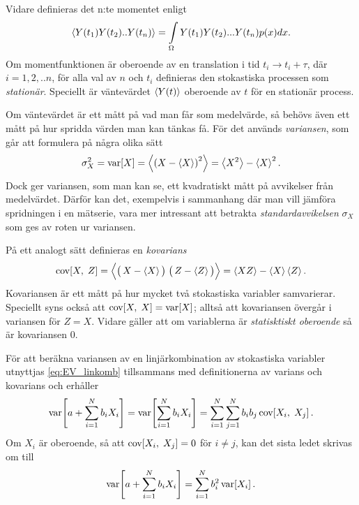 Vidare definieras det n:te momentet enligt 
\begin{equation}
    \ev{Y(t_1)Y(t_2)..Y(t_n)} = \int_{\Omega} Y(t_1)Y(t_2)...Y(t_n)p(x)dx.
\end{equation}
Om momentfunktionen är oberoende av en translation i tid $t_i\to t_i+\tau$, där $i=1,2,..n$, för alla val av $n$ och $t_i$ definieras den stokastiska processen som \emph{stationär}. Speciellt är väntevärdet $\ev{Y(t)}$ oberoende av $t$ för en stationär process. 

Om väntevärdet är ett mått på vad man får som medelvärde, så behövs
även ett mått på hur spridda värden man kan tänkas få. För det används
\emph{variansen}, som går att formulera på några olika sätt~\cite{Rice_matstat2006}
\begin{equation}\label{eq:VAR}
\sigma_X^2=\VAR{X} = \ev{\left(X-\ev{X} \right)^2} = \ev{X^2}-\ev{X}^2.
\end{equation}
Dock ger variansen, som man kan se, ett kvadratiskt mått på
avvikelser från medelvärdet. Därför kan det, exempelvis i sammanhang
där man vill jämföra spridningen i en mätserie, vara mer intressant
att betrakta \emph{standardavvikelsen} $\sigma_X$ som ges av roten ur
variansen.


På ett analogt sätt definieras en \emph{kovarians}~\cite{Rice_matstat2006}
\begin{equation}\label{eq:COV}
\COV{X}{Z} 
= \Big\langle \big(\, X-\ev{X}\big)\;\big(\, Z-\ev{Z}\big) \Big\rangle
= \ev{XZ}-\ev{X}\ev{Z}.
\end{equation}
Kovariansen är ett mått på hur mycket två stokastiska variabler
samvarierar. Speciellt syns också att $\text{cov}\!\left[X,\;X\right]=\text{var}\!\left[X\right]$; alltså att
kovariansen övergår i variansen för $Z=X$. Vidare gäller att om
variablerna är \emph{statisktiskt oberoende} så är kovariansen 0.

För att beräkna variansen av en linjärkombination av stokastiska variabler utnyttjas \eqref{eq:EV_linkomb} tillsammans med definitionerna av varians och kovarians och erhåller
\begin{equation}
\text{var}\!\left[a+\sum_{i=1}^N b_i X_i\right] = \text{var}\!\left[\sum_{i=1}^N b_i X_i\right] 
= \sum_{i=1}^N\sum_{j=1}^N b_i b_j\, \text{cov}\!\left[X_i,\;X_j\right].
\end{equation}
Om $X_i$ är oberoende, så att $\text{cov}\!\left[X_i,\;X_j\right]=0$ för $i\neq j$, kan det sista ledet skrivas om till
\begin{equation}\label{eq:VAR_linkomb}
\text{var}\!\left[a+\sum_{i=1}^N b_i X_i\right] = \sum_{i=1}^N b_i^2\, \text{var}\!\left[X_i\right].
\end{equation}




